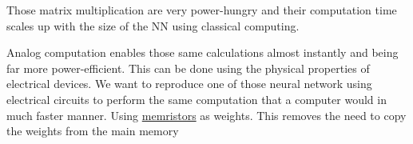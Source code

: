 Those matrix multiplication are very power-hungry and their computation time scales up with the size of the \ac{NN} using classical computing.

Analog computation enables those same calculations almost instantly and being far more power-efficient. This can be done using the physical properties of electrical devices.
We want to reproduce one of those neural network using electrical circuits to perform the same computation that a computer would in much faster manner.
Using \hyperref[subsec:memristors]{memristors} as weights. This removes the need to copy the weights from the main memory